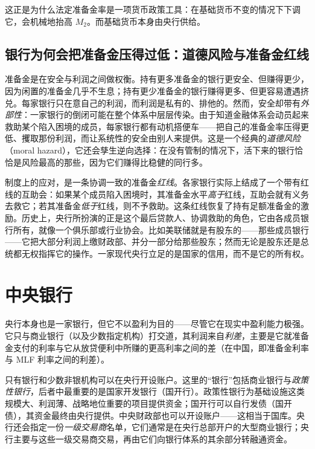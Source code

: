 这正是为什么法定准备金率是一项货币政策工具：在基础货币不变的情况下下调它，会机械地抬高 $M_2$。而基础货币本身由央行供给。


\subsection{银行为何会把准备金压得过低：道德风险与准备金红线}

准备金是在安全与利润之间做权衡。持有更多准备金的银行更安全、但赚得更少，因为闲置的准备金几乎不生息；持有更少准备金的银行赚得更多、但更容易遭遇挤兑。每家银行只在意自己的利润，而利润是私有的、排他的。然而，安全却带有\emph{外部性}：一家银行的倒闭可能在整个体系中层层传染。由于知道金融体系会动员起来救助某个陷入困境的成员，每家银行都有动机搭便车——把自己的准备金率压得更低、攫取那份利润，而让系统性的安全由别人来提供。这是一个经典的\emph{道德风险}（moral hazard），它还会孳生逆向选择：在没有管制的情况下，活下来的银行恰恰是风险最高的那些，因为它们赚得比稳健的同行多。

\begin{remark}[准备金红线即一条互助规则]
制度上的应对，是一条协调一致的准备金\emph{红线}。各家银行实际上结成了一个带有红线的互助会：如果某个成员陷入困境时，其准备金水平\emph{高于}红线，互助会就有义务去救它；若其准备金\emph{低于}红线，则不予救助。这条红线恢复了持有足额准备金的激励。历史上，央行所扮演的正是这个最后贷款人、协调救助的角色，它由各成员银行所有，就像一个俱乐部或行业协会。比如美联储就是有股东的——那些成员银行——它把大部分利润上缴财政部、并分一部分给那些股东；然而无论是股东还是总统都无权指挥它的操作。一家现代央行立足的是国家的信用，而不是它的所有权。
\end{remark}

\section{中央银行}

央行本身也是一家银行，但它不以盈利为目的——尽管它在现实中盈利能力极强。它只与商业银行（以及少数指定机构）打交道，其利润来自\emph{利差}，主要是它就准备金支付的利率与它从放贷便利中所赚的更高利率之间的差（在中国，即准备金利率与 MLF 利率之间的利差）。

\begin{remark}[谁可以在央行开户]
只有银行和少数非银机构可以在央行开设账户。这里的“银行”包括商业银行与\emph{政策性银行}，后者中最重要的是国家开发银行（国开行）。政策性银行为基础设施这类规模大、利润薄、战略地位重要的项目提供资金；国开行可以自行发债（国开债），其资金最终由央行提供。中央财政部也可以开设账户——这相当于国库。央行还会指定一份\emph{一级交易商}名单，它们通常是在央行总部开户的大型商业银行；央行主要与这些一级交易商交易，再由它们向银行体系的其余部分转融通资金。
\end{remark}

